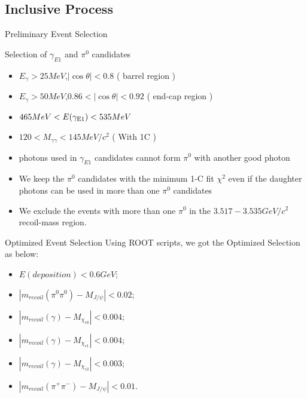 \documentclass{beamer}
\begin{document}
\subsection{Inclusive Process}
\begin{frame}{Preliminary Event Selection}
\begin{block}{Selection of $\gamma_{E1}$ and $\pi^0$ candidates}
\begin{itemize}
\item $E_{\gamma}>25 MeV$,$|\cos\theta|<0.8$ ( barrel region )
\item $E_{\gamma}>50 MeV$,$0.86<|\cos\theta|<0.92$ ( end-cap region )
\item $465MeV < E({\gamma}_{{\rm E1}}) < 535MeV$
\item $120<M_{\gamma \gamma}<145 MeV/c^2$ ( With 1C )
\item photons used in $\gamma_{E1}$ candidates cannot form $\pi^0$ with another good photon
\item We keep the $\pi^0$ candidates with the minimum 1-C fit $\chi^2$ even if the daughter photons can be used in more than one $\pi^0$ candidates
\item We exclude the events with more than one $\pi^0$ in the $3.517-3.535GeV/c^2$ recoil-mass region.
\end{itemize}
\end{block}
\end{frame}
\begin{frame}{Optimized Event Selection}
Using ROOT scripts, we got the Optimized Selection as below:
\begin{itemize}
\item $E(deposition)<0.6GeV$;
\item $|m_{recoil}(\pi^0 \pi^0)-M_{J/\psi}|<0.02$;
\item $|m_{recoil}(\gamma)-M_{\chi_{c0}}|<0.004$;
\item $|m_{recoil}(\gamma)-M_{\chi_{c1}}|<0.004$;
\item $|m_{recoil}(\gamma)-M_{\chi_{c2}}|<0.003$;
\item $|m_{recoil}(\pi^+ \pi^-)-M_{J/\psi}|<0.01$.
\end{itemize}
\end{frame}
\end{document}
